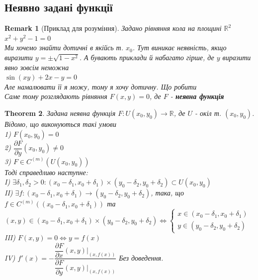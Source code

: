 \documentclass[a4paper, 14pt]{extarticle}
\def\bigline{\vspace{5mm}\\}
\theoremstyle{theoremdd}
\newtheorem{theorem}{Theorem}[subsection]
\theoremstyle{theoremdd}
\theoremstyle{theoremdd}
\theoremstyle{theoremdd}
\theoremstyle{theoremdd}
\theoremstyle{theoremdd}
\newtheorem{remark}[theorem]{Remark}
\theoremstyle{theoremdd}
\theoremstyle{theoremdd}
\def\departial#1#2{\dfrac{\partial {#1}}{\partial {#2}}}
\begin{document}
\subsection{Неявно задані функції}
\begin{remark}[Приклад для розуміння]
Задано рівняння кола на площині $\mathbb{R}^2$ \\
$x^2+y^2-1=0$\\
Ми хочемо знайти дотичні в якійсь т. $x_0$. Тут виникає неявність, якщо виразити $y = \pm \sqrt{1-x^2}$. А бувають приклади й набагато гірше, де $y$ виразити явно зовсім неможна\\
$\sin(xy)+2x-y=0$\\
Але намалювати її я можу, тому я хочу дотичну. Що робити
\bigline
Саме тому розглядають рівняння $F(x,y) = 0$, де $F$ - \textbf{неявна функція}
\end{remark}

\begin{theorem}
Задана неявна функція $F: U(x_0,y_0) \to \mathbb{R}$, де $U$ - окіл т. $(x_0,y_0)$. Відомо, що виконуються такі умови\\
1) $F(x_0,y_0)=0$\\
2) $\departial{F}{y}(x_0,y_0) \neq 0$\\
3) $F \in C^{(m)}(U(x_0,y_0))$\\
Тоді справедливо наступне:\\
I) $\exists \delta_1,\delta_2 > 0: (x_0-\delta_1,x_0+\delta_1) \times (y_0-\delta_2,y_0+\delta_2) \subset U(x_0,y_0)$\\
II) $\exists f: (x_0-\delta_1,x_0+\delta_1) \to (y_0-\delta_2,y_0+\delta_2)$, така, що \\ $f \in C^{(m)}((x_0-\delta_1,x_0+\delta_1))$ та\\
$(x,y) \in (x_0-\delta_1,x_0+\delta_1) \times (y_0-\delta_2,y_0+\delta_2) \iff \begin{cases} x \in (x_0-\delta_1,x_0+\delta_1) \\ y \in (y_0-\delta_2,y_0+\delta_2) \end{cases}$\\
III) $F(x,y) = 0 \iff y=f(x)$\\
IV) $f'(x) = -\dfrac{\departial{F}{x}(x,y) \Big|_{(x,f(x))}}{\departial{F}{y}(x,y) \Big|_{(x,f(x))}}$
\textit{Без доведення.}
\bigline
\end{theorem}
\end{document}
